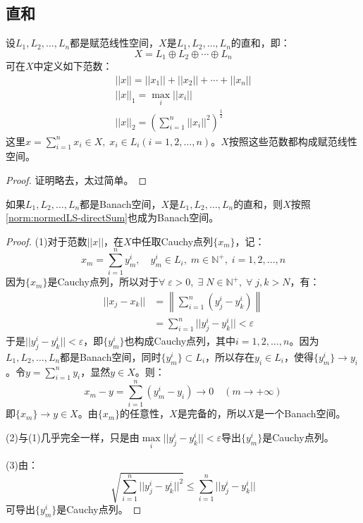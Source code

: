 \subsection{直和}
\begin{theorem}
	设$L_1,L_2,\dots,L_n$都是赋范线性空间，$X$是$L_1,L_2,\dots,L_n$的直和，即：
	\begin{equation*}
		X=L_1\oplus L_2\oplus\cdots\oplus L_n
	\end{equation*}
	可在$X$中定义如下范数：
	\begin{gather*}\label{norm:normedLS-directSum}
		||x||=||x_1||+||x_2||+\cdots+||x_n|| \\
		||x||_1=\max_i||x_i|| \\
		||x||_2=\left(\sum_{i=1}^n||x_i||^2\right)^\frac{1}{2}
	\end{gather*}
	这里$x=\sum\limits_{i=1}^{n}x_i\in X,\;x_i\in L_i(i=1,2,\dots,n)$。$X$按照这些范数都构成赋范线性空间。
\end{theorem}
\begin{proof}
	证明略去，太过简单。
\end{proof}
\begin{theorem}
	如果$L_1,L_2,\dots,L_n$都是Banach空间，$X$是$L_1,L_2,\dots,L_n$的直和，则$X$按照\cref{norm:normedLS-directSum}也成为Banach空间。
\end{theorem}
\begin{proof}
	(1)对于范数$||x||$，在$X$中任取Cauchy点列$\{x_m\}$，记：
	\begin{equation*}
		x_m=\sum_{i=1}^{n}y_m^{i},\quad y_m^{i}\in L_i,\;m\in\mathbb{N}^+,\;i=1,2,\dots,n
	\end{equation*}
	因为$\{x_m\}$是Cauchy点列，所以对于$\forall\;\varepsilon>0,\;\exists\;N\in\mathbb{N}^+,\;\forall\;j,k>N$，有：
	\begin{align*}
		||x_j-x_k||
		&=\left\|\sum_{i=1}^{n}(y_j^i-y_k^i)\right\| \\
		&=\sum_{i=1}^{n}||y_j^i-y_k^i||<\varepsilon
	\end{align*}
	于是$||y_j^i-y_k^i||<\varepsilon$，即$\{y_m^i\}$也构成Cauchy点列，其中$i=1,2,\dots,n$。因为$L_1,L_2,\dots,L_n$都是Banach空间，同时$\{y_m^i\}\subset L_i$，所以存在$y_i\in L_i$，使得$\{y_m^i\}\to y_i$。令$y=\sum\limits_{i=1}^{n}y_i$，显然$y\in X$。则：
	\begin{equation*}
		x_m-y=\sum_{i=1}^{n}(y_m^i-y_i)\to 0\quad(m\to +\infty)
	\end{equation*}
	即$\{x_m\}\to y\in X$。由$\{x_m\}$的任意性，$X$是完备的，所以$X$是一个Banach空间。\par
	(2)与(1)几乎完全一样，只是由$\max\limits_i||y_j^i-y_k^i||<\varepsilon$导出$\{y_m^i\}$是Cauchy点列。\par
	(3)由：
	\begin{equation*}
		\sqrt{\sum_{i=1}^{n}||y_j^i-y_k^i||^2}\leqslant\sum_{i=1}^{n}||y_j^i-y_k^i||
	\end{equation*}
	可导出$\{y_m^i\}$是Cauchy点列。
\end{proof}

